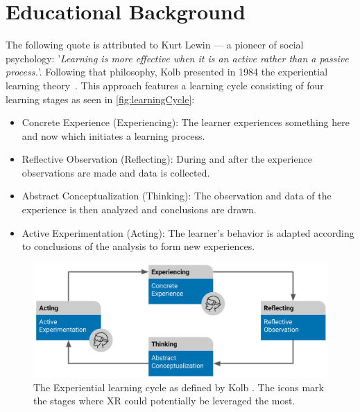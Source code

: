 %
\chapter{Educational Background}
\label{sec:concepts}

The following quote is attributed to Kurt Lewin --- a pioneer of social psychology: '\emph{Learning is more effective when it is an active rather than a passive process.}'. Following that philosophy, Kolb presented in 1984 the experiential learning theory~\cite{kolb:1984:experiential}.
This approach features a learning cycle consisting of four learning stages as seen in \autoref{fig:learningCycle}:

\begin{itemize}
    \item Concrete Experience (Experiencing): The learner experiences something here and now which initiates a learning process.
    \item Reflective Observation (Reflecting): During and after the experience observations are made and data is collected.
    \item Abstract Conceptualization (Thinking): The observation and data of the experience is then analyzed and conclusions are drawn.
    \item Active Experimentation (Acting): The learner's behavior is adapted according to conclusions of the analysis to form new experiences. 
\end{itemize}

\begin{figure}[h!bt]
	\centering
	\includegraphics[width=0.9\linewidth]{pictures/ExperientialLearningCycle2.png}
	\captionsetup{labelfont=bf,textfont=it}
	\caption{The Experiential learning cycle as defined by Kolb \cite{kolb:1984:experiential}. The icons mark the stages where XR could potentially be leveraged the most.\label{fig:learningCycle}}
\end{figure}

